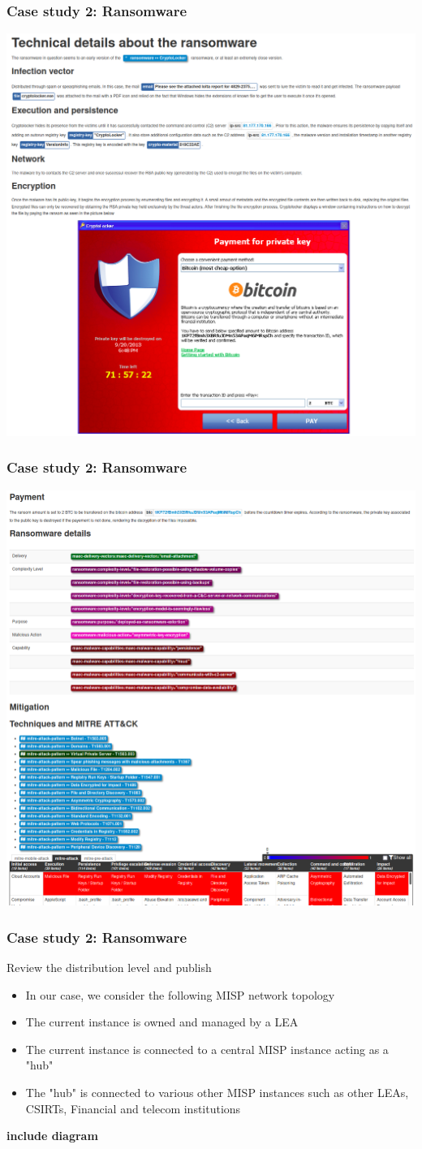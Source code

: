 \begin{frame}
    \frametitle{Case study 2: Ransomware}
    \begin{center}
        \includegraphics[width=0.65\linewidth]{pictures/case2/event-report-2.png}
    \end{center}
\end{frame}

\begin{frame}
    \frametitle{Case study 2: Ransomware}
    \begin{center}
        \includegraphics[width=0.65\linewidth]{pictures/case2/event-report-3.png}
    \end{center}
\end{frame}

\begin{frame}
    \frametitle{Case study 2: Ransomware}
    Review the distribution level and publish
    \begin{itemize}
        \item In our case, we consider the following MISP network topology
        \item The current instance is owned and managed by a LEA
        \item The current instance is connected to a central MISP instance acting as a "hub"
        \item The "hub" is connected to various other MISP instances such as other LEAs, CSIRTs, Financial and telecom institutions
    \end{itemize}
    \textbf{include diagram}
\end{frame}


